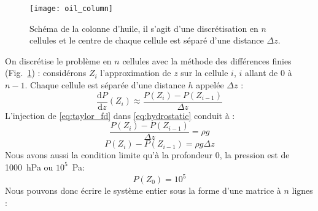 \begin{figure}[!ht]
  \centering
  \texttt{[image: oil\_column]}
  \caption{Schéma de la colonne d'huile, il s'agit d'une discrétisation en $n$ cellules et le centre de chaque cellule est séparé d'une distance $\Delta{z}$.}
  \label{fig:oil_schema}
\end{figure}
%
On discrétise le problème en $n$ cellules avec la méthode des différences finies (Fig.~\ref{fig:oil_schema}) : considérons $Z_i$ l'approximation de $z$ sur la cellule $i$, $i$ allant de $0$ à $n-1$.
%
Chaque cellule est séparée d'une distance $h$ appelée $\Delta{z}$ :
%
\begin{equation}
\label{eq:taylor_fd}
\frac{\mathrm d P}{\mathrm d z}(Z_i) \approx \frac{P(Z_{i}) - P(Z_{i-1})}{\Delta{z}}
\end{equation}
%
L'injection de \eqref{eq:taylor_fd} dans \eqref{eq:hydrostatic} conduit à :
%
\begin{equation}
\frac{P(Z_{i}) - P(Z_{i-1})}{\Delta{z}} = \rho{}g
\end{equation}
\begin{equation}
\label{eq:system_pressure}
P(Z_{i}) - P(Z_{i-1}) = \rho{}g\Delta{z}
\end{equation}
Nous avons aussi la condition limite qu'à la profondeur 0, la pression est de 1000~hPa ou $10^5$~Pa:
%
\begin{equation}
P(Z_0) = 10^5
\end{equation}
%
Nous pouvons donc écrire le système entier sous la forme d'une matrice à $n$ lignes :
%
